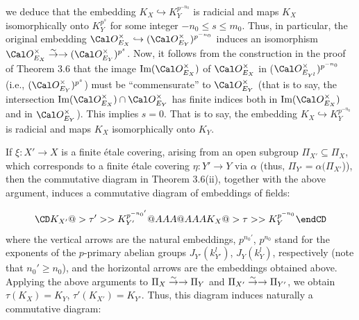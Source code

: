 we deduce that the embedding
$K_X\hookrightarrow K_Y^{p^{-{n_0}}}$ is radicial and 
maps $K_X$ isomorphically onto $K_Y^{p^{s}}$ 
for some integer $ -n_0\leq s \leq m_0$. 
Thus, in particular, the original embedding 
$\Cal O_{E_{X}}^{\times} \hookrightarrow 
(\Cal O_{E_{Y}}^{\times})^{p^{-{n_0}}}$ 
induces an isomorphism 
$\Cal O_{E_{X}}^{\times} \isom
(\Cal O_{E_{Y}}^{\times})^{p^s}$. Now, it follows from the 
construction in the proof of Theorem 3.6 that 
the image $\text{Im}(\Cal O_{E_{X}}^{\times})$ 
of $\Cal O_{E_{X}}^{\times}$ in 
($\Cal O_{E_{Y^{l}}}^{\times})^{p^{-{n_0}}}$ 
(i.e., $(\Cal O_{E_{Y}}^{\times})^{p^s}$) must be ``commensurate'' 
to $\Cal O_{E_{Y}}^{\times}$ (that is to say, 
the intersection $\text{Im}(\Cal O_{E_{X}}^{\times}) \cap\Cal O_{E_{Y}}^{\times}$
has finite indices both in $\text{Im}(\Cal O_{E_{X}}^{\times})$ 
and in $\Cal O_{E_{Y}}^{\times}$). This implies $s=0$. That is to say, 
the embedding
$K_X\hookrightarrow K_Y^{p^{-{n_0}}}$ is radicial and 
maps $K_X$ isomorphically onto $K_Y$. 

If $\xi :X'\to X$ is a finite \'etale covering, 
arising from an open subgroup $\Pi_{X'}\subseteq \Pi_X$, 
which corresponds to a finite \'etale covering $\eta:Y'\to Y$ via $\alpha$ (thus, 
$\Pi_{Y'}=\alpha (\Pi_{X'}$)), then the commutative diagram in Theorem 3.6(ii), 
together with the above argument,
induces a commutative diagram of embeddings of fields: 

$$
\CD
K_{X'} @>{\tau'}>> K_{Y'}^{p^{-{n_0}'}}\\
@AAA                        @AAA  \\
K_X @>{\tau}>>  K_Y^{p^{-{n_0}}}\\
\endCD
$$
where the vertical arrows are the natural embeddings,  
$p^{{n_0}'}$, $p^{n_0}$ stand for the exponents of the $p$-primary 
abelian groups $J_{Y'}(k_{Y'}^l)$, $J_Y(k_Y^l)$, respectively
(note that $n_0'\ge n_0$),  
and the horizontal arrows are the embeddings obtained above.
Applying the above arguments to $\Pi_X\overset \sim \to \rightarrow\Pi_Y$ and 
$\Pi_{X'}\overset \sim \to \rightarrow\Pi_{Y'}$, we obtain $\tau(K_X)=K_Y$, 
$\tau'(K_{X'})=K_{Y'}$. Thus, 
this diagram induces naturally a commutative diagram:



